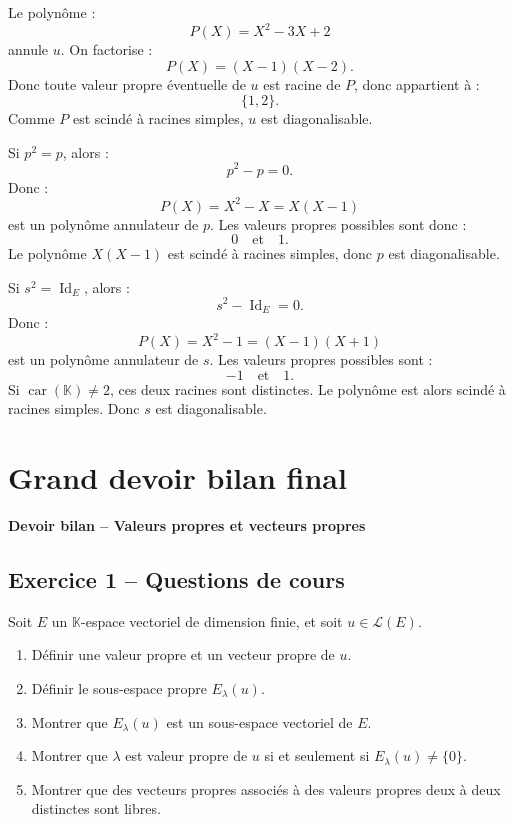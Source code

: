 \documentclass[11pt,a4paper]{article}
\newcommand{\K}{\mathbb K}
\newcommand{\Lcal}{\mathcal L}
\newcommand{\Id}{\operatorname{Id}}
\begin{document}
\begin{correctionbox}[10]
Le polynôme :
\[
P(X)=X^2-3X+2
\]
annule \(u\).  
On factorise :
\[
P(X)=(X-1)(X-2).
\]
Donc toute valeur propre éventuelle de \(u\) est racine de \(P\), donc appartient à :
\[
\{1,2\}.
\]
Comme \(P\) est scindé à racines simples, \(u\) est diagonalisable.
\end{correctionbox}

\begin{correctionbox}[11]
Si \(p^2=p\), alors :
\[
p^2-p=0.
\]
Donc :
\[
P(X)=X^2-X=X(X-1)
\]
est un polynôme annulateur de \(p\).  
Les valeurs propres possibles sont donc :
\[
0
\quad\text{et}\quad
1.
\]
Le polynôme \(X(X-1)\) est scindé à racines simples, donc \(p\) est diagonalisable.
\end{correctionbox}

\begin{correctionbox}[12]
Si \(s^2=\Id_E\), alors :
\[
s^2-\Id_E=0.
\]
Donc :
\[
P(X)=X^2-1=(X-1)(X+1)
\]
est un polynôme annulateur de \(s\).  
Les valeurs propres possibles sont :
\[
-1
\quad\text{et}\quad
1.
\]
Si \(\operatorname{car}(\K)\neq2\), ces deux racines sont distinctes.  
Le polynôme est alors scindé à racines simples.  
Donc \(s\) est diagonalisable.
\end{correctionbox}

\newpage
\section{Grand devoir bilan final}

\begin{center}
\Large\textbf{Devoir bilan -- Valeurs propres et vecteurs propres}
\end{center}

\subsection*{Exercice 1 -- Questions de cours}

Soit \(E\) un \(\K\)-espace vectoriel de dimension finie, et soit \(u\in\Lcal(E)\).

\begin{enumerate}
    \item Définir une valeur propre et un vecteur propre de \(u\).
    \item Définir le sous-espace propre \(E_\lambda(u)\).
    \item Montrer que \(E_\lambda(u)\) est un sous-espace vectoriel de \(E\).
    \item Montrer que \(\lambda\) est valeur propre de \(u\) si et seulement si \(E_\lambda(u)\neq\{0\}\).
    \item Montrer que des vecteurs propres associés à des valeurs propres deux à deux distinctes sont libres.
\end{enumerate}
\end{document}
